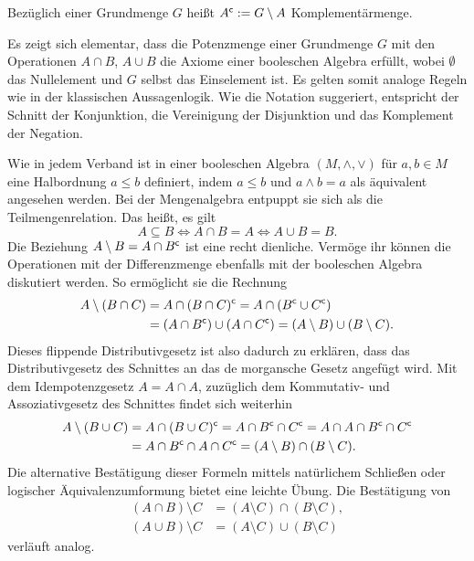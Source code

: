 \begin{Definition}[Komplement]\newlinefirst
Bezüglich einer Grundmenge $G$ heißt $A^\mathsf c := G\setminus A$
Komplementärmenge.
\end{Definition}
Es zeigt sich elementar, dass die Potenzmenge einer Grundmenge $G$
mit den Operationen $A\cap B$, $A\cup B$ die Axiome
einer booleschen Algebra erfüllt, wobei
$\emptyset$ das Nullelement und $G$ selbst das Einselement ist. Es
gelten somit analoge Regeln wie in der klassischen Aussagenlogik. Wie
die Notation suggeriert, entspricht der Schnitt der Konjunktion, die
Vereinigung der Disjunktion und das Komplement der Negation.

Wie in jedem Verband ist in einer booleschen Algebra
$(M,\wedge,\vee)$ für $a,b\in M$ eine Halbordnung $a\le b$
definiert, indem $a\le b$ und $a\wedge b = a$ als äquivalent
angesehen werden. Bei der Mengenalgebra entpuppt sie sich
als die Teilmengenrelation. Das heißt, es gilt%
\[A\subseteq B\iff A\cap B = A\iff A\cup B = B.\]
Die Beziehung $A\setminus B = A\cap B^\mathsf c$ ist eine recht dienliche.
Vermöge ihr können die Operationen mit der Differenzmenge ebenfalls mit
der booleschen Algebra diskutiert werden. So ermöglicht sie
die Rechnung
\begin{align*}
A\setminus (B\cap C) &= A\cap (B\cap C)^\mathsf c
= A\cap (B^\mathsf c\cup C^\mathsf c)\\
&= (A\cap B^\mathsf c)\cup (A\cap C^\mathsf c)
= (A\setminus B)\cup (B\setminus C).
\end{align*}
Dieses flippende Distributivgesetz ist also dadurch zu erklären,
dass das Distributivgesetz des Schnittes an das de morgansche Gesetz
angefügt wird. Mit dem Idempotenzgesetz $A=A\cap A$, zuzüglich
dem Kommutativ- und Assoziativgesetz des Schnittes findet sich weiterhin
\begin{align*}
A\setminus (B\cup C) &= A\cap (B\cup C)^\mathsf c
= A\cap B^\mathsf c\cap C^\mathsf c = A\cap A\cap B^\mathsf c\cap C^\mathsf c\\
&= A\cap B^\mathsf c\cap A\cap C^\mathsf c
= (A\setminus B)\cap (B\setminus C).
\end{align*}
Die alternative Bestätigung dieser Formeln mittels natürlichem Schließen
oder logischer Äquivalenzumformung bietet eine leichte Übung.
Die Bestätigung von
\begin{align*}
(A\cap B)\setminus C &= (A\setminus C)\cap (B\setminus C),\\
(A\cup B)\setminus C &= (A\setminus C)\cup (B\setminus C)
\end{align*}
verläuft analog.

